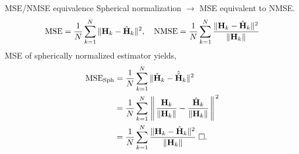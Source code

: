 \documentclass{beamer}
\renewcommand{\vec}[1]{\mathbf{#1}}
\begin{document}
  \begin{frame}{MSE/NMSE equivalence}
    \footnotesize{
    Spherical normalization $\to$ MSE equivalent to NMSE.
    \begin{align*}
      \text{MSE}=\frac 1N \sum_{k=1}^N\Arrowvert\mathbf H_k - \hat{\mathbf H}_k\Arrowvert^2,\quad \text{NMSE} =\frac 1N \sum_{k=1}^N\frac{\Arrowvert\mathbf H_k - \hat{\mathbf H}_k\Arrowvert^2}{\Arrowvert\mathbf H_k\Arrowvert} \\        
    \end{align*}
    \pause
    MSE of spherically normalized estimator yields,
    \begin{align*}
      \text{MSE}_{\text{Sph}} &= \frac 1N \sum_{k=1}^N\Arrowvert\check{\mathbf H}_k - \hat{\check{\mathbf H}}_k\Arrowvert^2 \\
      &= \frac 1N \sum_{k=1}^N\left\Arrowvert \frac{\mathbf H_k}{\Arrowvert\mathbf H_k\Arrowvert} - \frac{\hat{\mathbf H}_k}{\Arrowvert\mathbf H_k\Arrowvert}\right\Arrowvert^2 \\
      &= \frac 1N \sum_{k=1}^N\frac{\Arrowvert\mathbf H_k - \hat{\mathbf H}_k\Arrowvert^2}{\Arrowvert\mathbf H_k\Arrowvert} \; \Box.
    \end{align*}
    }
\end{frame}


\end{document}

